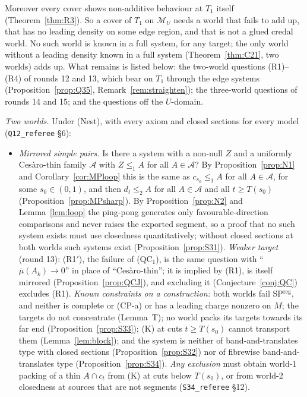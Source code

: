 \documentclass[11pt]{article}
\theoremstyle{definition}
\theoremstyle{remark}
\newcommand{\M}{\mathcal M}
\newcommand{\src}[1]{\texttt{#1}}
\begin{document}
Moreover every cover shows non-additive behaviour at $T_1$ itself (Theorem~\ref{thm:R3}). So a cover of $T_1$ on $\M_U$ needs a world that fails to add up, that has no leading density on some edge region, and that is not a glued credal world. No such world is known in a full system, for any target; the only world without a leading density known in a full system (Theorem~\ref{thm:C21}, two worlds) adds up. What remains is listed below: the two-world questions (R1)--(R4) of rounds 12 and 13, which bear on $T_1$ through the edge systems (Proposition~\ref{prop:Q35}, Remark~\ref{rem:straighten}); the three-world questions of rounds 14 and 15; and the questions off the $U$-domain.

\emph{Two worlds.} Under (Nest), with every axiom and closed sections for every model (\src{Q12\_referee} \S6):
\begin{itemize}[leftmargin=*]
\item[\textbf{(R1)}] \emph{Mirrored simple pairs.} Is there a system with a non-null $Z$ and a uniformly Ces\`aro-thin family $\mathcal A$ with $Z\le_1A$ for all $A\in\mathcal A$? By Proposition~\ref{prop:N1} and Corollary~\ref{cor:MPloop} this is the same as $c_{s_0}\le_1A$ for all $A\in\mathcal A$, for some $s_0\in(0,1)$, and then $d_t\le_2A$ for all $A\in\mathcal A$ and all $t\ge T(s_0)$ (Proposition~\ref{prop:MPsharp}). By Proposition~\ref{prop:N2} and Lemma~\ref{lem:loop} the ping-pong generates only favourable-direction comparisons and never raises the exported segment, so a proof that no such system exists must use closedness quantitatively; without closed sections at both worlds such systems exist (Proposition~\ref{prop:S31}). \emph{Weaker target} (round 13): (R1$'$), the failure of (QC$_1$), is the same question with ``$\bar\mu(A_k)\to0$'' in place of ``Ces\`aro-thin''; it is implied by (R1), is itself mirrored (Proposition~\ref{prop:QCJ}), and excluding it (Conjecture~\ref{conj:QC}) excludes (R1). \emph{Known constraints on a construction:} both worlds fail SP$^{\mathrm{reg}}$, and neither is complete or (CP-a) or has a leading charge nonzero on $M$; the targets do not concentrate (Lemma~T); no world packs its targets towards its far end (Proposition~\ref{prop:S33}); (K) at cuts $t\ge T(s_0)$ cannot transport them (Lemma~\ref{lem:block}); and the system is neither of band-and-translates type with closed sections (Proposition~\ref{prop:S32}) nor of fibrewise band-and-translates type (Proposition~\ref{prop:S34}). \emph{Any exclusion} must obtain world-1 packing of a thin $A\cap c_t$ from (K) at cuts below $T(s_0)$, or from world-2 closedness at sources that are not segments (\src{S34\_referee} \S12).

\end{itemize}
\end{document}
